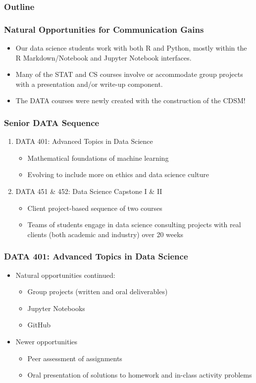 \documentclass[xcolor={dvipsnames}]{beamer}
\newcommand{\ft}{\frametitle}
\newcommand{\bi}{\begin{itemize}}
\newcommand{\be}{\begin{enumerate}}
\newcommand{\ei}{\end{itemize}}
\newcommand{\ee}{\end{enumerate}}
\begin{document}
\begin{frame}
\frametitle{Outline}
\tableofcontents[currentsection]
\end{frame}

\begin{frame}
\ft{Natural Opportunities for Communication Gains}
\pause
\bi
	\item Our data science students work with both R and Python, mostly within the R Markdown/Notebook and Jupyter Notebook interfaces. 
	\pause
	\item Many of the STAT and CS courses involve or accommodate group projects with a presentation and/or write-up component.
	\pause
	\item The DATA courses were newly created with the construction of the CDSM!
\ei
\end{frame}

\begin{frame}
\ft{Senior DATA Sequence}
\pause
\be
	\item DATA 401: Advanced Topics in Data Science
	\pause
		\bi
			\item Mathematical foundations of machine learning
			\item Evolving to include more on ethics and data science culture
		\ei
	\item DATA 451 \& 452: Data Science Capstone I \& II
	\pause
		\bi
			\item Client project-based sequence of two courses
			\item Teams of students engage in data science consulting projects with real clients (both academic and industry) over 20 weeks
		\ei
\ee
\end{frame}

\begin{frame}
\ft{DATA 401: Advanced Topics in Data Science}
\pause
\bi
	\item Natural opportunities continued:
		\bi
			\item Group projects (written and oral deliverables)
			\item Jupyter Notebooks
			\item GitHub
		\ei
	\pause
	
	\item Newer opportunities
		\bi
			\item Peer assessment of assignments
			\item Oral presentation of solutions to homework and in-class activity problems
		\ei
\ei
\end{frame}
\end{document}
